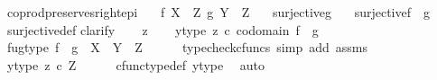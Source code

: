 \begin{isabellebody}
\isamarkupfalse%
%
\endisatagproof
{\isafoldproof}%
%
\isadelimproof
\isanewline
%
\endisadelimproof
\isanewline
{}\isamarkupfalse%
\ coprod{\isacharunderscore}{\kern0pt}preserves{\isacharunderscore}{\kern0pt}right{\isacharunderscore}{\kern0pt}epi{\isacharcolon}{\kern0pt}\isanewline
\ \ \ {\isachardoublequoteopen}f{\isacharcolon}{\kern0pt}\ X\ {\isasymrightarrow}\ Z{\isachardoublequoteclose}\ {\isachardoublequoteopen}g{\isacharcolon}{\kern0pt}\ Y\ {\isasymrightarrow}\ Z{\isachardoublequoteclose}\isanewline
\ \ \ {\isachardoublequoteopen}surjective{\isacharparenleft}{\kern0pt}g{\isacharparenright}{\kern0pt}{\isachardoublequoteclose}\isanewline
\ \ \ {\isachardoublequoteopen}surjective{\isacharparenleft}{\kern0pt}f\ {\isasymamalg}\ g{\isacharparenright}{\kern0pt}{\isachardoublequoteclose}\isanewline
%
\isadelimproof
\ \ %
\endisadelimproof
%
\isatagproof
{}\isamarkupfalse%
\ surjective{\isacharunderscore}{\kern0pt}def\isanewline
{}\isamarkupfalse%
{\isacharparenleft}{\kern0pt}clarify{\isacharparenright}{\kern0pt}\isanewline
\ \ \isamarkupfalse%
\ z\isanewline
\ \ \isamarkupfalse%
\ y{\isacharunderscore}{\kern0pt}type{\isacharcolon}{\kern0pt}\ {\isachardoublequoteopen}z\ {\isasymin}\isactrlsub c\ codomain\ {\isacharparenleft}{\kern0pt}f\ {\isasymamalg}\ g{\isacharparenright}{\kern0pt}{\isachardoublequoteclose}\isanewline
\ \ \isamarkupfalse%
\ fug{\isacharunderscore}{\kern0pt}type{\isacharcolon}{\kern0pt}\ {\isachardoublequoteopen}{\isacharparenleft}{\kern0pt}f\ {\isasymamalg}\ g{\isacharparenright}{\kern0pt}\ {\isacharcolon}{\kern0pt}\ {\isacharparenleft}{\kern0pt}X\ {\isasymCoprod}\ Y{\isacharparenright}{\kern0pt}\ {\isasymrightarrow}\ Z{\isachardoublequoteclose}\isanewline
\ \ \ \ \isamarkupfalse%
\ {\isacharparenleft}{\kern0pt}typecheck{\isacharunderscore}{\kern0pt}cfuncs{\isacharcomma}{\kern0pt}\ simp\ add{\isacharcolon}{\kern0pt}\ assms{\isacharparenright}{\kern0pt}\isanewline
\ \ \isamarkupfalse%
\ \isamarkupfalse%
\ y{\isacharunderscore}{\kern0pt}type{}{\isacharcolon}{\kern0pt}\ {\isachardoublequoteopen}z\ {\isasymin}\isactrlsub c\ Z{\isachardoublequoteclose}\isanewline
\ \ \ \ \isamarkupfalse%
\ cfunc{\isacharunderscore}{\kern0pt}type{\isacharunderscore}{\kern0pt}def\ y{\isacharunderscore}{\kern0pt}type\ \isamarkupfalse%
\ auto\isanewline
\ \ \isamarkupfalse%
\ \isamarkupfalse%

\end{isabellebody}
